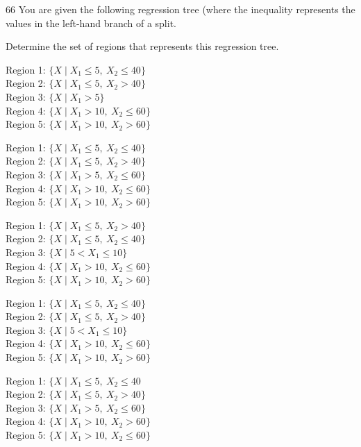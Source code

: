 \begin{question}{66}
You are given the following regression tree (where the inequality represents the values in the left-hand branch of a split.


Determine the set of regions that represents this regression tree.

\begin{choices}
\item Region 1: $\{X \mid X_1 \leqslant 5,\ X_2 \leqslant 40\}$ \\
      Region 2: $\{X \mid X_1 \leqslant 5,\ X_2 > 40\}$ \\
      Region 3: $\{X \mid X_1 > 5\}$ \\
      Region 4: $\{X \mid X_1 > 10,\ X_2 \leqslant 60\}$ \\
      Region 5: $\{X \mid X_1 > 10,\ X_2 > 60\}$
\item Region 1: $\{X \mid X_1 \leqslant 5,\ X_2 \leqslant 40\}$ \\
      Region 2: $\{X \mid X_1 \leqslant 5,\ X_2 > 40\}$ \\
      Region 3: $\{X \mid X_1 > 5,\ X_2 \leqslant 60\}$ \\
      Region 4: $\{X \mid X_1 > 10,\ X_2 \leqslant 60\}$ \\
      Region 5: $\{X \mid X_1 > 10,\ X_2 > 60\}$
\item Region 1: $\{X \mid X_1 \leqslant 5,\ X_2 > 40\}$ \\
      Region 2: $\{X \mid X_1 \leqslant 5,\ X_2 \leqslant 40\}$ \\
      Region 3: $\{X \mid 5 < X_1 \leqslant 10\}$ \\
      Region 4: $\{X \mid X_1 > 10,\ X_2 \leqslant 60\}$ \\
      Region 5: $\{X \mid X_1 > 10,\ X_2 > 60\}$
\item Region 1: $\{X \mid X_1 \leqslant 5,\ X_2 \leqslant 40\}$ \\
      Region 2: $\{X \mid X_1 \leqslant 5,\ X_2 > 40\}$ \\
      Region 3: $\{X \mid 5 < X_1 \leqslant 10\}$ \\
      Region 4: $\{X \mid X_1 > 10,\ X_2 \leqslant 60\}$ \\
      Region 5: $\{X \mid X_1 > 10,\ X_2 > 60\}$
\item %
      Region 1: $\{X \mid X_1 \leqslant 5,\ X_2 \leqslant 40$ \\
      Region 2: $\{X \mid X_1 \leqslant 5,\ X_2 > 40\}$ \\
      Region 3: $\{X \mid X_1 > 5,\ X_2 \leqslant 60\}$ \\
      Region 4: $\{X \mid X_1 > 10,\ X_2 > 60\}$ \\
      Region 5: $\{X \mid X_1 > 10,\ X_2 \leqslant 60\}$
\end{choices}
\end{question}

